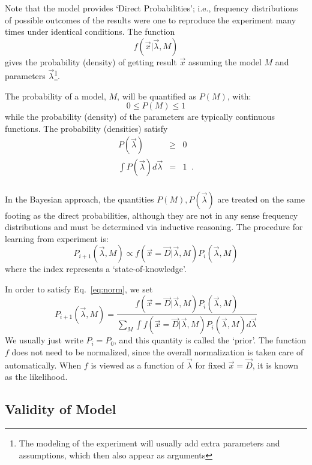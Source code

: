 \documentclass[11pt, a4paper]{article}
\begin{document}
Note that the model provides `Direct Probabilities'; i.e., frequency
distributions of possible outcomes of the results were one to
reproduce the experiment many times under identical conditions.  The
function
%
\begin{equation}
f(\vec{x}|\vec{\lambda},M)
\end{equation}
%
gives the probability (density) of getting result $\vec{x}$ assuming
the model $M$ and parameters $\vec{\lambda}$\footnote{The modeling of
the experiment will usually add extra parameters and assumptions,
which then also appear as arguments}.

The probability of a model, $M$, will be quantified as $P(M)$, with:
%
\begin{equation}
\label{eq:norm}
0 \leq P(M) \leq 1
\end{equation}
%
while the probability (density) of the parameters are typically
continuous functions.  The probability (densities) satisfy
%
\begin{eqnarray*}
P(\vec{\lambda}) & \ge & 0 \\
\int P(\vec{\lambda}) d\vec{\lambda} &=&1 \;\; .\\
\end{eqnarray*}

In the Bayesian approach, the quantities $P(M), P(\vec{\lambda})$ are
treated on the same footing as the direct probabilities, although they
are not in any sense frequency distributions and must be determined
via inductive reasoning.  The procedure for learning from experiment
is:
%
\begin{equation}
P_{i+1}(\vec{\lambda},M) \propto f(\vec{x}=\vec{D}|\vec{\lambda},M) P_{i}(\vec{\lambda},M) 
\end{equation}
%
where the index represents a `state-of-knowledge'.  

In order to satisfy Eq.~\ref{eq:norm}, we set
%
\begin{equation}
P_{i+1}(\vec{\lambda},M) =\frac{f(\vec{x}=\vec{D}|\vec{\lambda},M) P_{i}(\vec{\lambda},M)}
{\sum_M \int f(\vec{x}=\vec{D}|\vec{\lambda},M) P_{i}(\vec{\lambda},M) d{\vec{\lambda}}}
\end{equation}
%
We usually just write $P_i=P_0$, and this quantity is called the
`prior'.  The function $f$ does not need to be normalized, since the
overall normalization is taken care of automatically.  When $f$ is
viewed as a function of $\vec{\lambda}$ for fixed $\vec{x}=\vec{D}$,
it is known as the likelihood.

\subsection{Validity of Model}
\label{subsection:validity}
\end{document}
